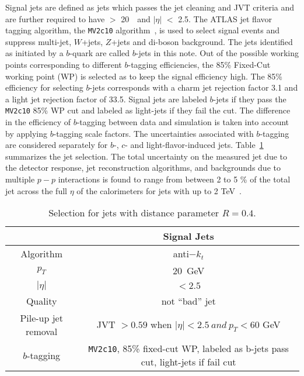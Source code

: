 
Signal jets are defined as jets which passes the jet cleaning and JVT criteria and are further required to have \pt $>$ 20~\GeV ~and $|\eta|$ $<$ 2.5. The ATLAS jet flavor tagging algorithm, the \texttt{MV2c10} algorithm~\cite{ATL-PHYS-PUB-2016-012}, is used to select signal events and suppress multi-jet, $W$+jets, $Z$+jets and di-boson background. The jets identified as initiated by a $b$-quark are called $b$-jets in this note. Out of the possible working points corresponding to different $b$-tagging efficiencies, the 85\% Fixed-Cut working point (WP) is selected as to keep the signal efficiency high. The 85\% efficiency for selecting $b$-jets corresponds with a charm jet rejection factor 3.1 and a light jet rejection factor of 33.5. Signal jets are labeled $b$-jets if they pass the \texttt{MV2c10} 85\% WP cut 
and labeled as light-jets if they fail the cut. The difference in the efficiency of $b$-tagging between data and simulation is taken into account by applying $b$-tagging scale factors. The uncertainties associated with $b$-tagging are considered separately for $b$-, $c$- and light-flavor-induced jets. Table~\ref{tab:sjdefinit} summarizes the jet selection. The total uncertainty on the measured jet \pt due to the detector response, jet reconstruction algorithms, and backgrounds due to multiple $p-p$ interactions is found to range from between 2 to 5 \% of the total jet \pt across the full $\eta$ of the calorimeters for jets with \pt up to 2 TeV~\cite{ATLAS-JES-RUN2}.

\begin{table}[htbp!]
\caption{Selection for jets with distance parameter $R = 0.4$.}\label{tab:sjdefinit}
\centering 
\begin{tabular}{|c||c|}        
 \hline
 & Signal Jets\\
 \hline
 Algorithm            & anti$-k_t$\\
 $p_T$                & 20~GeV\\
 $|\eta|$             & $< 2.5 $\\
 Quality              & not ``bad'' jet\\
 Pile-up jet removal & JVT $> 0.59$ when $|\eta| < 2.5 ~ and ~p_T < 60 $ GeV\\    
 $b$-tagging          &  \texttt{MV2c10}, 85\% fixed-cut WP, labeled as b-jets pass cut, light-jets if fail cut\\ 
\hline                          
\end{tabular}
\end{table}

